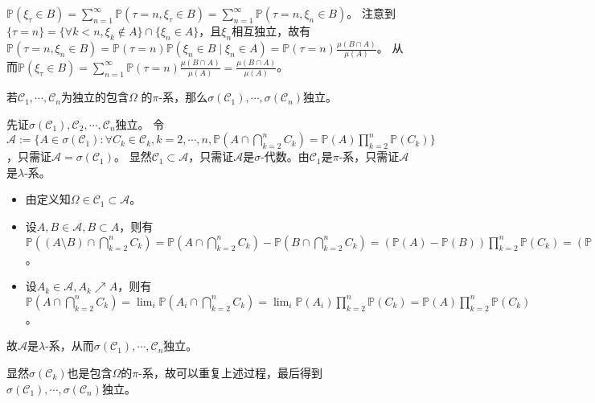 \documentclass{ctexart}
\begin{document}
\begin{solution}
  \(\mathbb{P}(\xi_{\tau} \in B)=\sum_{n =1}^{\infty} \mathbb{P}(\tau=n,\xi_{\tau} \in B )= \sum_{n =1}^{\infty} \mathbb{P}(\tau=n,\xi_{n} \in B )\)。
  注意到\(\{\tau=n\}=\{\forall k <n,\xi_k \notin A\} \cap \{\xi_n \in A\} \)，且\(\xi_n \)相互独立，故有
  \(\mathbb{P}(\tau=n,\xi_n \in B)=\mathbb{P}(\tau=n)\mathbb{P}(\xi_n \in B \mid \xi_n \in A)=\mathbb{P}(\tau=n) \frac{\mu(B \cap A)}{\mu(A)} \)。
  从而\(\mathbb{P}(\xi_{\tau} \in B)=\sum_{n = 1}^{\infty} \mathbb{P}(\tau=n) \frac{\mu(B \cap A)}{\mu(A)}=\frac{\mu(B \cap A)}{\mu(A)} \)。
\end{solution}

\begin{problem}\label{pro:11}
  若\(\mathcal{C}_1,\cdots,\mathcal{C}_n \)为独立的包含\(\Omega \) 的\(\pi \)-系，那么\(\sigma(\mathcal{C}_1),\cdots,\sigma(\mathcal{C}_n)\)独立。
\end{problem}
\begin{solution}
  先证\(\sigma(\mathcal{C}_1),\mathcal{C}_2,\cdots,\mathcal{C}_n \)独立。
  令\(\mathcal{A}:=\{A \in \sigma( \mathcal{C}_1 ): \forall C_k \in \mathcal{C}_k,k=2,\cdots,n,\mathbb{P}(A \cap \bigcap_{k=2}^{n}C_k)=\mathbb{P}(A)\prod_{k=2}^{n}\mathbb{P}(C_k)\} \)，只需证\(\mathcal{A} = \sigma(\mathcal{C}_1) \)。
  显然\(\mathcal{C}_1 \subset \mathcal{A} \)，只需证\(\mathcal{A} \)是\(\sigma \)-代数。由\(\mathcal{C}_1 \)是\(\pi \)-系，只需证\(\mathcal{A} \)是\(\lambda \)-系。
  \begin{itemize}
    \item 由定义知\(\Omega \in \mathcal{C}_1 \subset \mathcal{A} \)。
    \item 设\(A,B \in \mathcal{A} , B \subset A\)，则有\(\mathbb{P}((A\setminus B) \cap \bigcap_{k=2}^{n}C_k) = \mathbb{P}(A \cap \bigcap_{k=2}^{n}C_k)-\mathbb{P}(B \cap \bigcap_{k=2}^{n}C_k)= ( \mathbb{P}(A) -\mathbb{P}(B))\prod_{k=2}^{n}\mathbb{P}(C_k)=( \mathbb{P}(A\setminus B))\prod_{k=2}^{n}\mathbb{P}(C_k)\)。
    \item 设\(A_k \in \mathcal{A},A_k \nearrow A \)，则有\(\mathbb{P}(A \cap \bigcap_{k=2}^{n}C_k) = \lim_{i}\mathbb{P}(A_i \cap \bigcap_{k=2}^{n}C_k)= \lim_{i}\mathbb{P}(A_i) \prod_{k=2}^{n}\mathbb{P}(C_k)=\mathbb{P}(A)\prod_{k=2}^{n}\mathbb{P}(C_k)\)。
  \end{itemize}
  故\(\mathcal{A} \)是\(\lambda \)-系，从而\(\sigma(\mathcal{C}_1),\cdots,\mathcal{C}_n \)独立。

  显然\(\sigma(\mathcal{C}_k) \)也是包含\(\Omega \)的\(\pi \)-系，故可以重复上述过程，最后得到\(\sigma(\mathcal{C}_1),\cdots,\sigma(\mathcal{C}_n) \)独立。
\end{solution}
\end{document}
